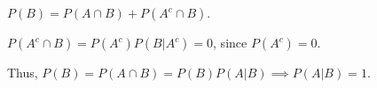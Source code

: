 $P(B) = P(A \cap B) + P(A ^{c} \cap B)$.

$P(A^{c} \cap B) = P(A^{c})P(B|A^{c}) = 0$, since $P(A^{c}) = 0$.

Thus, $P(B) = P(A \cap B) = P(B)P(A|B) \implies P(A|B) = 1$.
